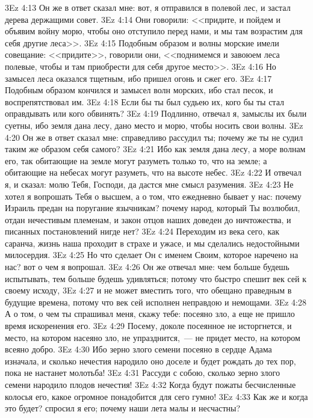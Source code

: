 \vs 3Ez 4:13 Он же в ответ сказал мне: вот, я отправился в полевой лес, и застал дерева держащими совет.
\vs 3Ez 4:14 Они говорили: <<придите, и пойдем и объявим войну морю, чтобы оно отступило перед нами, и мы там возрастим для себя другие леса>>.
\vs 3Ez 4:15 Подобным образом и волны морские имели совещание: <<придите>>, говорили они, <<поднимемся и завоюем леса полевые, чтобы и там приобрести для себя другое место>>.
\vs 3Ez 4:16 Но замысел леса оказался тщетным, ибо пришел огонь и сжег его.
\vs 3Ez 4:17 Подобным образом кончился и замысел волн морских, ибо стал песок, и воспрепятствовал им.
\vs 3Ez 4:18 Если бы ты был судьею их, кого бы ты стал оправдывать или кого обвинять?
\vs 3Ez 4:19 Подлинно, отвечал я, замыслы их были суетны, ибо земля дана лесу, дано место и морю, чтобы носить свои волны.
\vs 3Ez 4:20 Он же в ответ сказал мне: справедливо рассудил ты; почему же ты не судил таким же образом себя самого?
\vs 3Ez 4:21 Ибо как земля дана лесу, а море волнам его, так обитающие на земле могут разуметь только то, что на земле; а обитающие на небесах могут разуметь, что на высоте небес.
\vs 3Ez 4:22 И отвечал я, и сказал: молю Тебя, Господи, да дастся мне смысл разумения.
\vs 3Ez 4:23 Не хотел я вопрошать Тебя о высшем, а о том, что ежедневно бывает у нас: почему Израиль предан на поругание язычникам? почему народ, который Ты возлюбил, отдан нечестивым племенам, и закон отцов наших доведен до ничтожества, и писанных постановлений нигде нет?
\vs 3Ez 4:24 Переходим из века сего, как саранча, жизнь наша проходит в страхе и ужасе, и мы сделались недостойными милосердия.
\vs 3Ez 4:25 Но что сделает Он с именем Своим, которое наречено на нас? вот о чем я вопрошал.
\vs 3Ez 4:26 Он же отвечал мне: чем больше будешь испытывать, тем больше будешь удивляться; потому что быстро спешит век сей к своему исходу,
\vs 3Ez 4:27 и не может вместить того, что обещано праведным в будущие времена, потому что век сей исполнен неправдою и немощами.
\vs 3Ez 4:28 А о том, о чем ты спрашивал меня, скажу тебе: посеяно зло, а еще не пришло время искоренения его.
\vs 3Ez 4:29 Посему, доколе посеянное не исторгнется, и место, на котором насеяно зло, не упразднится,~--- не придет место, на котором всеяно добро.
\vs 3Ez 4:30 Ибо зерно злого семени посеяно в сердце Адама изначала, и сколько нечестия народило оно доселе и будет рождать до тех пор, пока не настанет молотьба!
\vs 3Ez 4:31 Рассуди с собою, сколько зерно злого семени народило плодов нечестия!
\vs 3Ez 4:32 Когда будут пожаты бесчисленные колосья его, какое огромное понадобится для сего гумно!
\vs 3Ez 4:33 Как же и когда это будет? спросил я его; почему наши лета малы и несчастны?
